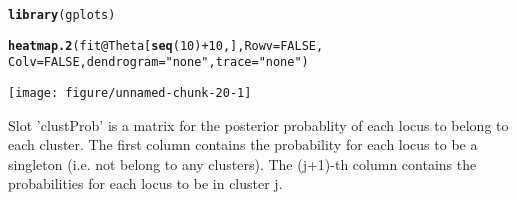 \documentclass[a4paper,10pt]{article}\usepackage[]{graphicx}\usepackage[]{color}
\makeatletter
\def\maxwidth{ %
  \ifdim\Gin@nat@width>\linewidth
    \linewidth
  \else
    \Gin@nat@width
  \fi
}
\newcommand{\hlnum}[1]{\textcolor[rgb]{0.686,0.059,0.569}{#1}}%
\newcommand{\hlstr}[1]{\textcolor[rgb]{0.192,0.494,0.8}{#1}}%
\newcommand{\hlopt}[1]{\textcolor[rgb]{0,0,0}{#1}}%
\newcommand{\hlstd}[1]{\textcolor[rgb]{0.345,0.345,0.345}{#1}}%
\newcommand{\hlkwc}[1]{\textcolor[rgb]{0.333,0.667,0.333}{#1}}%
\newcommand{\hlkwd}[1]{\textcolor[rgb]{0.737,0.353,0.396}{\textbf{#1}}}%
\newenvironment{kframe}{%
 \def\at@end@of@kframe{}%
 \ifinner\ifhmode%
  \def\at@end@of@kframe{\end{minipage}}%
  \begin{minipage}{\columnwidth}%
 \fi\fi%
 \def\FrameCommand##1{\hskip\@totalleftmargin \hskip-\fboxsep
 \colorbox{shadecolor}{##1}\hskip-\fboxsep
     \hskip-\linewidth \hskip-\@totalleftmargin \hskip\columnwidth}%
 \MakeFramed {\advance\hsize-\width
   \@totalleftmargin\z@ \linewidth\hsize
   \@setminipage}}%
 {\par\unskip\endMakeFramed%
 \at@end@of@kframe}
\newenvironment{knitrout}{}{} %
\makeatother
\begin{document}
\begin{knitrout}
\color{fgcolor}\begin{kframe}
\begin{alltt}
\hlkwd{library}\hlstd{(gplots)}
\end{alltt}


{\ttfamily\noindent\itshape\color{messagecolor}{\#\# KernSmooth 2.23 loaded\\\#\# Copyright M. P. Wand 1997-2009\\\#\# \\\#\# Attaching package: 'gplots'\\\#\# \\\#\# The following object is masked from 'package:IRanges':\\\#\# \\\#\#\ \ \ \  space\\\#\# \\\#\# The following object is masked from 'package:stats':\\\#\# \\\#\#\ \ \ \  lowess}}\begin{alltt}
\hlkwd{heatmap.2}\hlstd{(fit}\hlopt{@}\hlkwc{Theta}\hlstd{[}\hlkwd{seq}\hlstd{(}\hlnum{10}\hlstd{)} \hlopt{+} \hlnum{10}\hlstd{, ],} \hlkwc{Rowv} \hlstd{=} \hlnum{FALSE}\hlstd{,}
    \hlkwc{Colv} \hlstd{=} \hlnum{FALSE}\hlstd{,} \hlkwc{dendrogram} \hlstd{=} \hlstr{"none"}\hlstd{,} \hlkwc{trace} \hlstd{=} \hlstr{"none"}\hlstd{)}
\end{alltt}
\end{kframe}

{\centering \texttt{[image: figure/unnamed-chunk-20-1]} 

}



\end{knitrout}

Slot 'clustProb' is a matrix for the posterior probablity of each locus to belong to each cluster. The first column contains the probability for each locus to be a singleton (i.e. not belong to any clusters). The (j+1)-th column contains the probabilities for each locus to be in cluster j.
\end{document}
